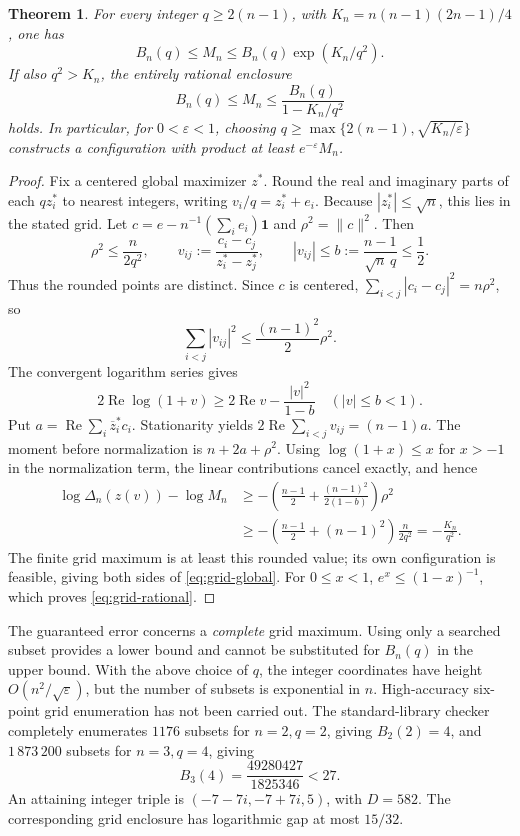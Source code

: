 \documentclass[11pt]{article}
\newtheorem{theorem}{Theorem}[section]
\theoremstyle{remark}
\numberwithin{equation}{section}
\begin{document}
\begin{theorem}\label{thm:grid-global}
For every integer $q\ge2(n-1)$, with
$K_n=n(n-1)(2n-1)/4$, one has
\begin{equation}\label{eq:grid-global}
 B_n(q)\le M_n\le B_n(q)\exp(K_n/q^2).
\end{equation}
If also $q^2>K_n$, the entirely rational enclosure
\begin{equation}\label{eq:grid-rational}
 B_n(q)\le M_n\le\frac{B_n(q)}{1-K_n/q^2}
\end{equation}
holds. In particular, for $0<\varepsilon<1$, choosing
$q\ge\max\{2(n-1),\sqrt{K_n/\varepsilon}\}$ constructs a configuration
with product at least $e^{-\varepsilon}M_n$.
\end{theorem}
\begin{proof}
Fix a centered global maximizer $z^*$. Round the real and imaginary
parts of each $qz_i^*$ to nearest integers, writing $v_i/q=z_i^*+e_i$.
Because $|z_i^*|\le\sqrt n$, this lies in the stated grid.
Let $c=e-n^{-1}(\sum_i e_i)\mathbf1$ and $\rho^2=\|c\|^2$.
Then
\[
 \rho^2\le\frac{n}{2q^2},\qquad
 v_{ij}:=\frac{c_i-c_j}{z_i^*-z_j^*},\qquad
 |v_{ij}|\le b:=\frac{n-1}{\sqrt n\,q}\le\frac12.
\]
Thus the rounded points are distinct. Since $c$ is centered,
$\sum_{i<j}|c_i-c_j|^2=n\rho^2$, so
\[
 \sum_{i<j}|v_{ij}|^2\le\frac{(n-1)^2}{2}\rho^2.
\]
The convergent logarithm series gives
\[
 2\operatorname{Re}\log(1+v)\ge
 2\operatorname{Re}v-\frac{|v|^2}{1-b}\quad (|v|\le b<1).
\]
Put $a=\operatorname{Re}\sum_i\overline z_i^*c_i$.
Stationarity yields $2\operatorname{Re}\sum_{i<j}v_{ij}=(n-1)a$.
The moment before normalization is $n+2a+\rho^2$.
Using $\log(1+x)\le x$ for $x>-1$ in the normalization term, the
linear contributions cancel exactly, and hence
\begin{align*}
 \log\Delta_n(z(v))-\log M_n
 &\ge-\left(\frac{n-1}{2}+
       \frac{(n-1)^2}{2(1-b)}\right)\rho^2\\
 &\ge-\left(\frac{n-1}{2}+(n-1)^2\right)\frac{n}{2q^2}
   =-\frac{K_n}{q^2}.
\end{align*}
The finite grid maximum is at least this rounded value; its own
configuration is feasible, giving both sides of
\eqref{eq:grid-global}. For $0\le x<1$, $e^x\le(1-x)^{-1}$,
which proves \eqref{eq:grid-rational}.
\end{proof}

The guaranteed error concerns a \emph{complete} grid maximum.
Using only a searched subset provides a lower bound and cannot be
substituted for $B_n(q)$ in the upper bound. With the above choice of
$q$, the integer coordinates have height $O(n^2/\sqrt\varepsilon)$,
but the number of subsets is exponential in $n$. High-accuracy
six-point grid enumeration has not been carried out.
The standard-library checker completely enumerates $1176$ subsets
for $n=2,q=2$, giving $B_2(2)=4$, and $1\,873\,200$ subsets for
$n=3,q=4$, giving
\begin{equation}\label{eq:grid-three}
 B_3(4)=\frac{49280427}{1825346}<27.
\end{equation}
An attaining integer triple is $(-7-7i,-7+7i,5)$, with $D=582$.
The corresponding grid enclosure has logarithmic gap at most $15/32$.
\end{document}

